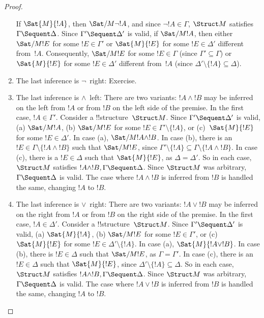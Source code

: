\documentclass[../../include/open-logic-section]{subfiles}
\begin{document}
\begin{proof}
\begin{enumerate}
  If $\Sat{M}{!A}$, then $\Sat/{M}{\lnot !A}$, and since $\lnot !A
  \in \Gamma$, $\Struct M$ satisfies $\Gamma \Sequent \Delta$.  Since
  $\Gamma' \Sequent \Delta'$ is valid, if $\Sat/{M}{!A}$, then either
  $\Sat/{M}{!E}$ for some $!E \in \Gamma'$ or $\Sat{M}{!E}$ for some
  $!E \in \Delta'$ different from~$!A$. Consequently, $\Sat/{M}{!E}$
  for some $!E \in \Gamma$ (since $\Gamma' \subseteq \Gamma$) or
  $\Sat{M}{!E}$ for some $!E \in \Delta'$ different from~$!A$ (since
  $\Delta' \setminus \{!A\} \subseteq \Delta$).
\item The last inference is $\lnot$~right: Exercise.
\item The last inference is $\land$~left: There are two variants: $!A
  \land !B$ may be inferred on the left from $!A$ or from $!B$ on the
  left side of the premise.  In the first case, $!A \in \Gamma'$.
  Consider a !!{structure}~$\Struct M$. Since $\Gamma' \Sequent
  \Delta'$ is valid, (a) $\Sat/{M}{!A}$, (b) $\Sat/{M}{!E}$ for some
  $!E \in \Gamma' \setminus \{!A\}$, or (c)~$\Sat{M}{!E}$ for some $!E
  \in \Delta'$.  In case (a), $\Sat/{M}{!A \land !B}$. In case (b),
  there is an $!E \in \Gamma \setminus \{!A \land !B\}$ such that
  $\Sat/{M}{!E}$, since $\Gamma' \setminus \{!A\} \subseteq \Gamma
  \setminus \{!A \land !B\}$. In case (c), there is a $!E \in \Delta$
  such that $\Sat{M}{!E}$, as $\Delta = \Delta'$. So in each case,
  $\Struct M$ satisfies $!A \land !B, \Gamma \Sequent \Delta$. Since
  $\Struct M$ was arbitrary, $\Gamma \Sequent \Delta$ is valid. The
  case where $!A \land !B$ is inferred from $!B$ is handled the same,
  changing $!A$ to $!B$.
\item The last inference is $\lor$~right: There are two variants: $!A
  \lor !B$ may be inferred on the right from $!A$ or from $!B$ on the
  right side of the premise.  In the first case, $!A \in \Delta'$.
  Consider a !!{structure}~$\Struct M$. Since $\Gamma' \Sequent
  \Delta'$ is valid, (a) $\Sat{M}{!A}$, (b) $\Sat/{M}{!E}$ for some
  $!E \in \Gamma'$, or (c)~$\Sat{M}{!E}$ for some $!E \in \Delta'
  \setminus \{!A\}$.  In case (a), $\Sat{M}{!A \lor !B}$. In case (b),
  there is $!E \in \Delta$ such that $\Sat/{M}{!E}$, as $\Gamma =
  \Gamma'$. In case (c), there is an $!E \in \Delta$ such that
  $\Sat{M}{!E}$, since $\Delta' \setminus \{!A\} \subseteq \Delta$. So
  in each case, $\Struct M$ satisfies $!A \land !B, \Gamma \Sequent
  \Delta$. Since $\Struct M$ was arbitrary, $\Gamma \Sequent \Delta$
  is valid. The case where $!A \lor !B$ is inferred from $!B$ is
  handled the same, changing $!A$ to $!B$.

\end{enumerate}
\end{proof}
\end{document}
